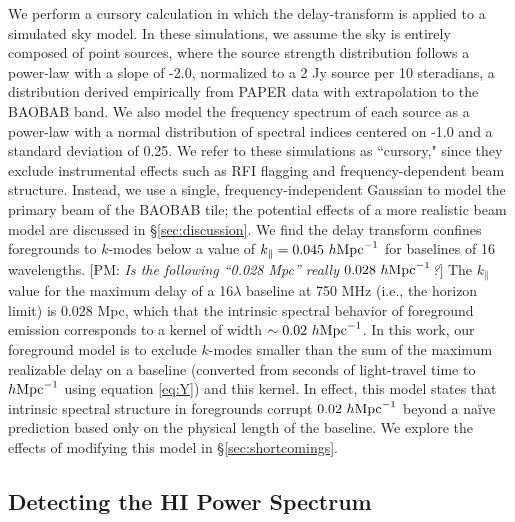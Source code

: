 \documentclass[10pt,iop]{emulateapj}
\def\pvm#1{[PM: {\it #1}] }
\begin{document}
We perform a cursory calculation in which the delay-transform is applied to a simulated sky model.  
In these simulations, we assume the sky is entirely composed of point sources, where the source
strength distribution follows a power-law with a slope of -2.0, normalized
to a 2 Jy source per 10 steradians, a distribution derived empirically
from PAPER data with extrapolation to the BAOBAB band.  
We also model the frequency spectrum of each
source as a power-law with a normal distribution of spectral indices centered on -1.0
and a standard deviation of 0.25.  We refer to these
simulations as ``cursory," since they exclude instrumental effects such as RFI flagging
and frequency-dependent beam structure.  
Instead, we use a single, frequency-independent Gaussian to model the primary beam of the
BAOBAB tile; the potential effects of a more realistic beam model are discussed in \S\ref{sec:discussion}.
We find the delay transform confines foregrounds to $k$-modes below a value of 
$k_{\parallel} = 0.045~h{\rm Mpc}^{-1}$ for baselines of 16 wavelengths.
\pvm{Is the following ``0.028 Mpc'' really $0.028~h{\rm Mpc}^{-1}$?}
The $k_{\parallel}$ value for the maximum delay of a 16$\lambda$ baseline at 
750 MHz (i.e., the 
horizon limit) is 0.028 Mpc, which that the intrinsic spectral behavior of 
foreground emission
corresponds to a kernel of width $\sim 0.02~h{\rm Mpc}^{-1}$.  
In this work, our foreground model
is to exclude $k$-modes smaller than the sum of the maximum realizable delay on a baseline
(converted from seconds of light-travel time to $h{\rm Mpc}^{-1}$ using equation \ref{eq:Y}) 
and this kernel.  In effect, this model states that intrinsic spectral structure in foregrounds 
corrupt $0.02~h{\rm Mpc}^{-1}$ beyond a na\"{i}ve prediction based only on the physical 
length of the baseline.  We explore the effects of modifying this model in \S\ref{sec:shortcomings}.

\subsection{Detecting the HI Power Spectrum}
\label{sec:baobab32}
\end{document}
